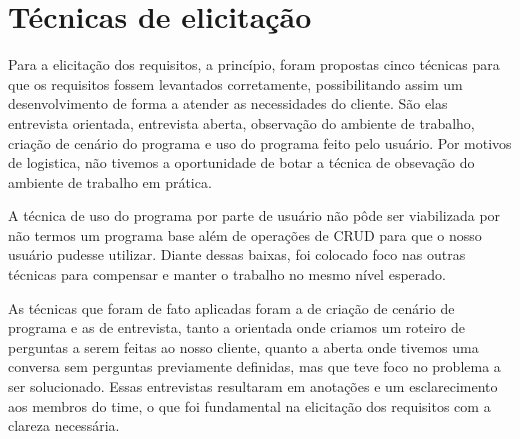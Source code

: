 \chapter{Técnicas de elicitação}

Para a elicitação dos requisitos, a princípio, foram propostas cinco técnicas para que os requisitos fossem levantados corretamente, possibilitando assim um desenvolvimento de forma a atender as necessidades do cliente. São elas entrevista orientada, entrevista aberta, observação do ambiente de trabalho, criação de cenário do programa e uso do programa feito pelo usuário.
Por motivos de logistica, não tivemos a oportunidade de botar a técnica de obsevação do ambiente de trabalho em prática. 

A técnica de uso do programa por parte de usuário não pôde ser viabilizada por não termos um programa base além de operações de CRUD para que o nosso usuário pudesse utilizar. Diante dessas baixas, foi colocado foco nas outras técnicas para compensar e manter o trabalho no mesmo nível esperado.

As técnicas que foram de fato aplicadas foram a de criação de cenário de programa e as de entrevista, tanto a orientada onde criamos um roteiro de perguntas a serem feitas ao nosso cliente, quanto a aberta onde tivemos uma conversa sem perguntas previamente definidas, mas que teve foco no problema a ser solucionado. Essas entrevistas resultaram em anotações e um esclarecimento aos membros do time, o que foi fundamental na elicitação dos requisitos com a clareza necessária.